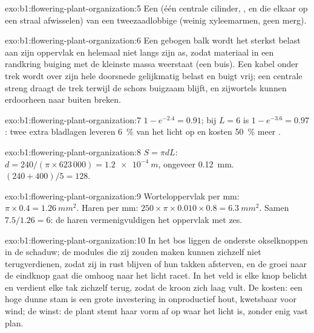 \begin{solution}{exo:b1:flowering-plant-organization:5}
Een  (één centrale cilinder, ,  en  die elkaar op
een straal afwisselen) van een tweezaadlobbige (weinig xyleemarmen, geen merg).
\end{solution}

\begin{solution}{exo:b1:flowering-plant-organization:6}
Een gebogen balk wordt het sterkst belast aan zijn oppervlak en helemaal niet
langs zijn as, zodat materiaal in een randkring buiging met de kleinste massa
weerstaat (een buis). Een kabel onder trek wordt over zijn hele doorsnede
gelijkmatig belast en buigt vrij; een centrale streng draagt de trek terwijl de
schors buigzaam blijft, en zijwortels kunnen erdoorheen naar buiten breken.
\end{solution}

\begin{solution}{exo:b1:flowering-plant-organization:7}
$1 - e^{-2.4} = 0.91$; bij $L = 6$ is $1 - e^{-3.6} = 0.97$: twee extra
bladlagen leveren \qty{6}{\%} van het licht op en kosten \qty{50}{\%}
meer .
\end{solution}

\begin{solution}{exo:b1:flowering-plant-organization:8}
$S = \pi d L$: $d = 240/(\pi\times 623\,000) = \qty{1.2e-4}{m}$, ongeveer
\qty{0.12}{mm}. $(240 + 400)/5 = 128$.
\end{solution}

\begin{solution}{exo:b1:flowering-plant-organization:9}
Worteloppervlak per mm: $\pi\times 0.4 = \qty{1.26}{mm^2}$. Haren per mm:
$250\times\pi\times 0.010\times 0.8 = \qty{6.3}{mm^2}$. Samen
$7.5/1.26 = 6$: de haren vermenigvuldigen het oppervlak met zes.
\end{solution}

\begin{solution}{exo:b1:flowering-plant-organization:10}
In het bos liggen de onderste okselknoppen in de schaduw; de modules die zij
zouden maken kunnen zichzelf niet terugverdienen, zodat zij in rust blijven of
hun takken afsterven, en de groei naar de eindknop gaat die omhoog naar het licht
racet. In het veld is elke knop belicht en verdient elke tak zichzelf terug,
zodat de kroon zich laag vult. De kosten: een hoge dunne stam is een grote
investering in onproductief hout, kwetsbaar voor wind; de winst: de plant stemt
haar vorm af op waar het licht is, zonder enig vast plan.
\end{solution}


